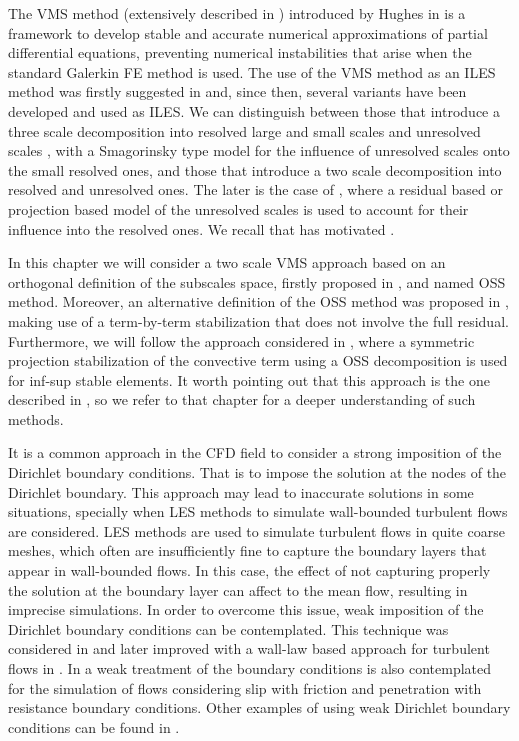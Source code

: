 The VMS method (extensively described in ) introduced by Hughes in \cite{hughes_multiscale_1995,hughes_variational_1998} is a framework to develop stable and accurate numerical approximations of partial differential equations, preventing numerical instabilities that arise when the standard Galerkin FE method is used. The use of the VMS method as an ILES method was firstly suggested in \cite{hughes_multiscale_2001,hughes_large_2001,codina_stabilized_2002} and, since then, several variants have been developed and used as ILES. We can distinguish between those that introduce a three scale decomposition into resolved large and small scales and unresolved scales \cite{koobus_variational_2004,john_variants_2008, john_numerical_2010, calderer2013residual}, with a Smagorinsky type model for the influence of unresolved scales onto the small resolved ones, and those that introduce a two scale decomposition into resolved and unresolved ones. The later is the case of  \cite{bazilevs_variational_2007,colomes_assessment_2015}, where a residual based or projection based model of the unresolved scales is used to account for their influence into the resolved ones. We recall that \cite{colomes_assessment_2015} has motivated .

In this chapter we will consider a two scale VMS approach based on an orthogonal definition of the subscales space, firstly proposed in \cite{codina_stabilization_2000}, and named OSS method. Moreover, an alternative definition of the OSS method was proposed in \cite{codina_analysis_2008}, making use of a term-by-term stabilization that does not involve the full residual. Furthermore, we will follow the approach considered in \cite{colomes_mixed_2015}, where a symmetric projection stabilization of the convective term using a OSS decomposition is used for inf-sup stable elements. It worth pointing out that this approach is the one described in , so we refer to that chapter for a deeper understanding of such methods.

It is a common approach in the CFD field to consider a strong imposition of the Dirichlet boundary conditions. That is to impose the solution at the nodes of the Dirichlet boundary. This approach may lead to inaccurate solutions in some situations, specially when LES methods to simulate wall-bounded turbulent flows are considered. LES methods are used to simulate turbulent flows in quite coarse meshes, which often are insufficiently fine to capture the boundary layers that appear in wall-bounded flows. In this case, the effect of not capturing properly the solution at the boundary layer can affect to the mean flow, resulting in imprecise simulations. In order to overcome this issue, weak imposition of the Dirichlet boundary conditions can be contemplated. This technique was considered in \cite{bazilevs_weak_2007-1} and later improved with a wall-law based approach for turbulent flows in \cite{bazilevs_weak_2007}. In \cite{john_slip_2002} a weak treatment of the boundary conditions is also contemplated for the simulation of flows considering slip with friction and penetration with resistance boundary conditions. Other examples of using weak Dirichlet boundary conditions can be found in \cite{davidson_lesfoil:_2000}.

